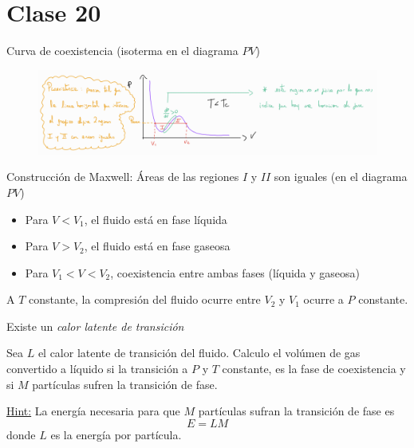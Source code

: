 \section{Clase 20}
Curva de coexistencia (isoterma en el diagrama $PV$)

\begin{figure}[h!]
	\centering
	\includegraphics[scale=0.3]{fig/20-1.png}
\end{figure}
Construcción de Maxwell: Áreas de las regiones $I$ y $II$ son iguales (en el diagrama $PV$)
\begin{itemize}
	\item Para $V<V_1$, el fluido está en fase líquida\\
	\item Para $V>V_2$, el fluido está en fase gaseosa\\
	\item Para $V_1<V<V_2$, coexistencia entre ambas fases (líquida y gaseosa)
\end{itemize}
A $T$ constante, la compresión del fluido ocurre entre $V_2$ y $V_1$ ocurre a $P$ constante.

Existe un \textit{calor latente de transición}


\begin{ej}
	Sea $L$ el calor latente de transición del fluido. Calculo el volúmen de gas convertido a líquido si la transición a $P$ y $T$ constante, es la fase de coexistencia y si $M$ partículas sufren la transición de fase.
	
	\underline{Hint:} La energía necesaria para que $M$ partículas sufran la transición de fase es
	\begin{equation}
  E=LM
\end{equation}
donde $L$ es la energía por partícula.
\end{ej}

